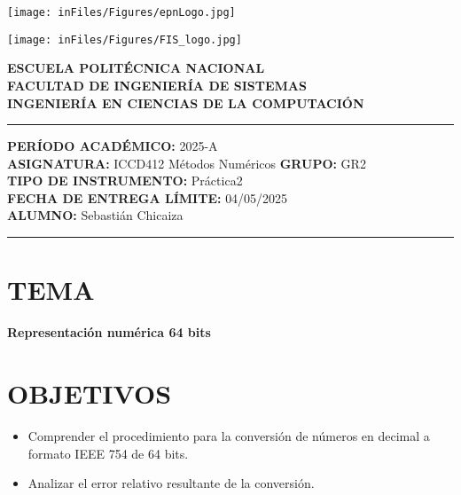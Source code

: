 \documentclass[12pt]{article}
\begin{document}
\begin{minipage}{0.45\textwidth}
    \texttt{[image: inFiles/Figures/epnLogo.jpg]}
\end{minipage}
\hfill
\begin{minipage}{0.45\textwidth}
    \raggedleft
    \texttt{[image: inFiles/Figures/FIS\_logo.jpg]}
\end{minipage}

\vspace{0.5cm}

\begin{center}
    \textbf{ESCUELA POLITÉCNICA NACIONAL}\\[0.2cm]
    \textbf{FACULTAD DE INGENIERÍA DE SISTEMAS}\\[0.2cm]
    \textbf{INGENIERÍA EN CIENCIAS DE LA COMPUTACIÓN}
\end{center}

\vspace{0.5cm}
\hrule
\vspace{0.5cm}

\noindent\textbf{PERÍODO ACADÉMICO:} 2025-A\\[0.2cm]
\noindent\textbf{ASIGNATURA:} ICCD412 Métodos Numéricos \hfill \textbf{GRUPO:} GR2\\[0.2cm]
\noindent\textbf{TIPO DE INSTRUMENTO:} Práctica2\\[0.2cm]
\noindent\textbf{FECHA DE ENTREGA LÍMITE:} {04/05/2025}\\[0.2cm]
\noindent\textbf{ALUMNO:} {Sebastián Chicaiza}

\vspace{0.5cm}
\hrule
\vspace{1cm}


\section*{TEMA}

\begin{center}
    \Large\textbf{Representación numérica 64 bits}
\end{center}
\vspace{0.5cm}

\section*{OBJETIVOS}
\begin{itemize}
    \item {Comprender el procedimiento para la conversión de números en decimal a formato IEEE 754 de 64 bits.}
    \item { Analizar el error relativo resultante de la conversión.}
\end{itemize}
\vspace{0.5cm}
\end{document}
